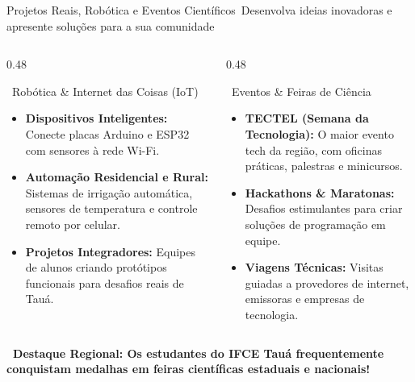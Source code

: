 \begin{frame}{Projetos Reais, Robótica e Eventos Científicos}{\faFlask\ Desenvolva ideias inovadoras e apresente soluções para a sua comunidade}
  \begin{columns}[t]
    \begin{column}{0.48\textwidth}
      \begin{purplecard}{\faRobot\ Robótica \& Internet das Coisas (IoT)}
        \tiny
        \begin{itemize}\setlength{\itemsep}{0.18em}
          \item \textbf{Dispositivos Inteligentes:} Conecte placas Arduino e ESP32 com sensores à rede Wi-Fi.
          \item \textbf{Automação Residencial e Rural:} Sistemas de irrigação automática, sensores de temperatura e controle remoto por celular.
          \item \textbf{Projetos Integradores:} Equipes de alunos criando protótipos funcionais para desafios reais de Tauá.
        \end{itemize}
      \end{purplecard}
    \end{column}
    
    \begin{column}{0.48\textwidth}
      \begin{greencard}{\faCalendar\ Eventos \& Feiras de Ciência}
        \tiny
        \begin{itemize}\setlength{\itemsep}{0.18em}
          \item \textbf{TECTEL (Semana da Tecnologia):} O maior evento tech da região, com oficinas práticas, palestras e minicursos.
          \item \textbf{Hackathons \& Maratonas:} Desafios estimulantes para criar soluções de programação em equipe.
          \item \textbf{Viagens Técnicas:} Visitas guiadas a provedores de internet, emissoras e empresas de tecnologia.
        \end{itemize}
      \end{greencard}
    \end{column}
  \end{columns}
  
  \vspace{0.08cm}
  \begin{center}
    \scriptsize \textcolor{IFCEDarkGreen}{\textbf{\faTrophy\ Destaque Regional: Os estudantes do IFCE Tauá frequentemente conquistam medalhas em feiras científicas estaduais e nacionais!}}
  \end{center}
\end{frame}
